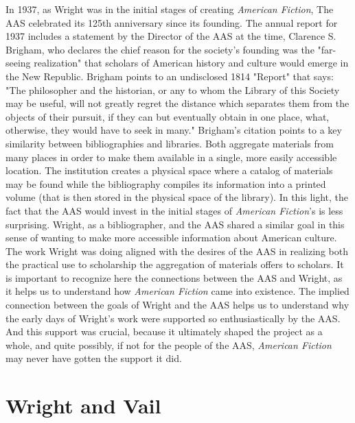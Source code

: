 In 1937, as Wright was in the initial stages of creating \textit{American Fiction}, The AAS celebrated its 125th anniversary since its founding. The annual report for 1937 includes a statement by the Director of the AAS at the time, Clarence S. Brigham, who declares the chief reason for the society's founding was the "far-seeing realization" that scholars of American history and culture would emerge in the New Republic. Brigham points to an undisclosed 1814 "Report" that says: "The philosopher and the historian, or any to whom the Library of this Society
may be useful, will not greatly regret the distance
which separates them from the objects of their pursuit,
if they can but eventually obtain in one place,
what, otherwise, they would have to seek in many."\autocite[6]{clarence_s._brigham_report_1937} 
Brigham's citation points to a key similarity between bibliographies and libraries. Both aggregate materials from many places in order to make them available in a single, more easily accessible location. The institution creates a physical space where a catalog of materials may be found while the bibliography compiles its information into a printed volume (that is then stored in the physical space of the library). In this light, the fact that the AAS would invest in the initial stages of \textit{American Fiction}'s is less surprising. Wright, as a bibliographer, and the AAS shared a similar goal in this sense of wanting to make more accessible information about American culture. The work Wright was doing aligned with the desires of the AAS in realizing both the practical use to scholarship the aggregation of materials offers to scholars. It is important to recognize here the connections between the AAS and Wright, as it helps us to understand how \textit{American Fiction} came into existence. The implied connection between the goals of Wright and the AAS helps us to understand why the early days of Wright's work were supported so enthusiastically by the AAS. And this support was crucial, because it ultimately shaped the project as a whole, and quite possibly, if not for the people of the AAS, \textit{American Fiction} may never have gotten the support it did.

\section{Wright and Vail}

